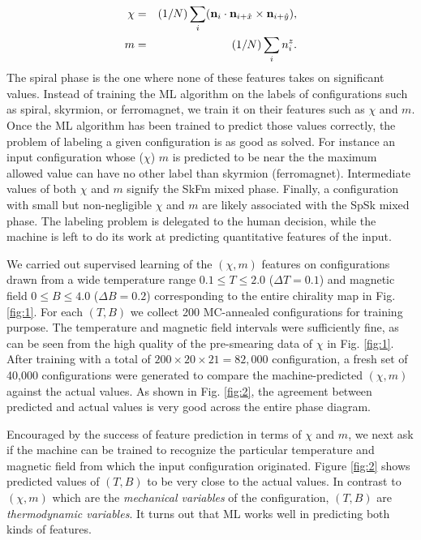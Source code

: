 \documentclass[reprint,amsmath,amssymb,aps,showpacs,superscriptaddress,prl]{revtex4-1}
\newcommand{\ba}{\begin{eqnarray}}
\newcommand{\ea}{\end{eqnarray}}
\renewcommand{\v}[1]{{\bf #1}}
\newcommand{\nn}{\nonumber \\}
\begin{document}
\ba
\chi & = & (1/N) \sum_i  ( \v n_i \cdot \v n_{i+\hat{x}} \times \v n_{i+\hat{y}} ) , \nn
%
m &=& (1/N) \sum_i n_i^z .  \label{eq:m-and-chi} \ea
%
The spiral phase is the one where none of these features takes on significant values. Instead of training the ML algorithm on the labels of configurations such as spiral, skyrmion, or ferromagnet, we train it on their features such as $\chi$ and $m$. Once the ML algorithm has been trained to predict those values correctly, the problem of labeling a given configuration is as good as solved. For instance an input configuration whose ($\chi$) $m$  is predicted to be near the the maximum allowed value can have no other label than skyrmion (ferromagnet). Intermediate values of both $\chi$ and $m$ signify the SkFm mixed phase. Finally, a configuration with small but non-negligible $\chi$ and $m$ are likely associated with the SpSk mixed phase. The labeling problem is delegated to the human decision, while the machine is left to do its work at predicting quantitative features of the input.

We carried out supervised learning of the $(\chi, m)$ features on configurations drawn from a wide temperature range $0.1 \le T \le 2.0$ ($\Delta T= 0.1$) and magnetic field $0 \le B \le 4.0$ ($\Delta B = 0.2$) corresponding to the entire chirality map in Fig. \ref{fig:1}. For each $(T,B)$ we collect 200 MC-annealed configurations for training purpose. The temperature and magnetic field intervals were sufficiently fine, as can be seen from the high quality of the pre-smearing data of $\chi$ in Fig. \ref{fig:1}. After training with a total of $200\times 20\times 21 = 82,000$ configuration, a fresh set of 40,000 configurations were generated to compare the machine-predicted $(\chi,m)$ against the actual values. As shown in Fig. \ref{fig:2}, the agreement between predicted and actual values is very good across the entire phase diagram.

Encouraged by the success of feature prediction in terms of $\chi$ and $m$, we next ask if the machine can be trained to recognize the particular temperature and magnetic field from which the input configuration originated. Figure \ref{fig:2} shows predicted values of $(T,B)$ to be very close to the actual values\cite{comment}. In contrast to $(\chi, m)$ which are the {\it mechanical variables} of the configuration, $(T,B)$ are {\it thermodynamic variables}. It turns out that ML
works well in predicting both kinds of features.
\\
\end{document}
